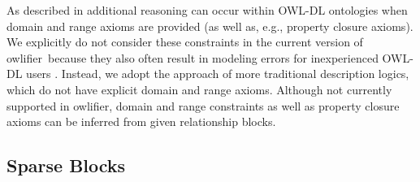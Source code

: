\documentclass[5p,authoryear]{elsarticle}
\newcommand{\owlifier}{\textsf{owlifier}}
\begin{document}
As described in \citep{rector04:_owl_pizzas} additional reasoning can
occur within OWL-DL ontologies when domain and range axioms are
provided (as well as, e.g., property closure axioms).  We explicitly
do not consider these constraints in the current version of \owlifier\
because they also often result in modeling errors for inexperienced
OWL-DL users \citep{rector04:_owl_pizzas}. Instead, we adopt the
approach of more traditional description logics, which do not have
explicit domain and range axioms.  Although not currently supported in
\owlifier, domain and range constraints as well as property closure
axioms can be inferred from given relationship blocks.

\subsection{Sparse Blocks} 
\end{document}

